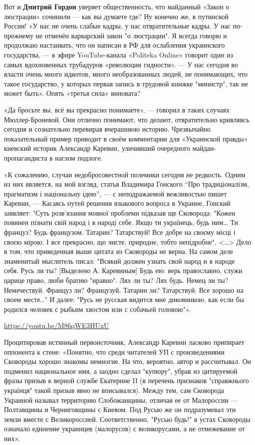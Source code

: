 Вот и \textbf{Дмитрий Гордон} уверяет общественность, что майданный «Закон о люстрации»
сочинили — как вы думаете где? Ну конечно же, в путинской России! «У нас не
очень слабые кадры, у нас отвратительные кадры. У нас по-прежнему не отменён
варварский закон "о люстрации". Я всегда говорю и продолжаю настаивать, что он
написан в РФ для ослабления украинского государства, — в эфире YouTube-канала
«Politeka Online» говорит один из самых вдохновенных трубадуров «революции
гидности». — У нас сегодня во власти очень много идиотов, много необразованных
людей, не понимающих, что такое государство, у которых первая запись в трудовой
книжке "министр", так не может быть». Опять «третья сила» виновата?

«Да бросьте вы, всё вы прекрасно понимаете», — говорил в таких случаях
Мюллер-Броневой. Они отлично понимают, что делают, отвратительно кривляясь
сегодня и сознательно перевирая вчерашнюю историю. Чрезвычайно показательный
пример приводит в своём комментарии для «Украинской правды» киевский историк
Александр Каревин, уличивший очередного майдан-пропагандиста в наглом подлоге.

«К сожалению, случаи недобросовестной полемики сегодня не редкость. Одним из
них является, на мой взгляд, статья Владимира Гонского \enquote{Про традиціоналізм,
прагматизм і національну ідею}, — с неподражаемой вежливостью пишет Каревин, —
Касаясь путей решения языкового вопроса в Украине, Гонский заявляет: "Суть
розв'язання мовної проблеми підказав ще Сковорода: "Кожен повинен пізнати свій
народ і в народі себе. Якщо ти українець, будь ним… Ти француз? Будь французом.
Татарин? Татарствуй! Все добре на своєму місці і своєю мірою. І все прекрасно,
що чисте, природне, тобто непідробне". <…> Дело в том, что приведенная выше
цитата из Сковороды не верна. На самом деле знаменитый мыслитель писал: "Всякий
должен узнать свой народ и в народе себя. Русь ли ты? [Выделено А. Каревиным]
Будь ею: верь православно, служи царице право, люби братию "нравно". Лях ли ты?
Лях будь. Немец ли ты? Немечествуй. Француз ли? Французуй. Татарин ли?
Татарствуй. Все хорошо на своем месте…" И далее: "Русь не русская видится мне
диковинкою, как если бы родился человек с рыбьим хвостом или с собачьей
головою"».

\url{https://youtu.be/M86qWE3HUxU}

Процитировав истинный первоисточник, Александр Каревин ласково припирает
оппонента к стене: «Понятно, что среди читателей УП с произведениями Сковороды
хорошо знакомы немногие. На что, вероятно, автор и рассчитывал. Он подменил
национальное имя, а заодно сделал "купюру", убрав из цитируемой фразы призыв к
верной службе Екатерине II (в перечень признаков "справжнього українця" такой
призыв явно не вписывался). Между тем, сам Сковорода Украиной называл
территорию Слобожанщины, отличая ее от Малороссии — Полтавщины и Черниговщины с
Киевом. Под Русью же он подразумевал эти земли вместе с Великороссией.
Соответственно, "Русью будь!" в устах Сковороды означало единение украинцев
(малорусов) с великорусами, а не отмежевание от них».

